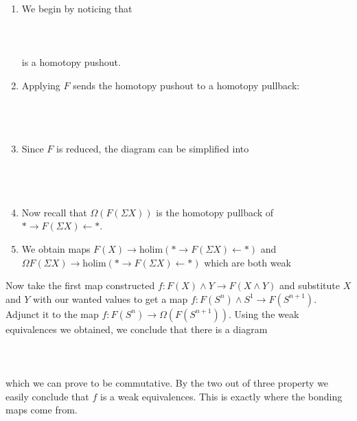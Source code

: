 \documentclass[a4paper]{article}
\begin{document}
\begin{enumerate}
\item We begin by noticing that \\~\\
\\~\\
is a homotopy pushout. 
\item Applying $F$ sends the homotopy pushout to a homotopy pullback: \\~\\
\\~\\
\item Since $F$ is reduced, the diagram can be simplified into \\~\\
\\~\\
\item Now recall that $\Omega(F(\Sigma X))$ is the homotopy pullback of $\ast\rightarrow F(\Sigma X)\leftarrow\ast$. 
\item We obtain maps $F(X)\to\text{holim}(\ast\rightarrow F(\Sigma X)\leftarrow\ast)$ and $\Omega F(\Sigma X)\to\text{holim}(\ast\rightarrow F(\Sigma X)\leftarrow\ast)$ which are both weak 
\end{enumerate}

Now take the first map constructed $f:F(X)\wedge Y\to F(X\wedge Y)$ and substitute $X$ and $Y$ with our wanted values to get a map $f:F(S^n)\wedge S^1\to F(S^{n+1})$. Adjunct it to the map $f:F(S^n)\to\Omega(F(S^{n+1}))$. Using the weak equivalences we obtained, we conclude that there is a diagram \\~\\
\\~\\
which we can prove to be commutative. By the two out of three property we easily conclude that $f$ is a weak equivalences. This is exactly where the bonding maps come from. 
\end{document}
